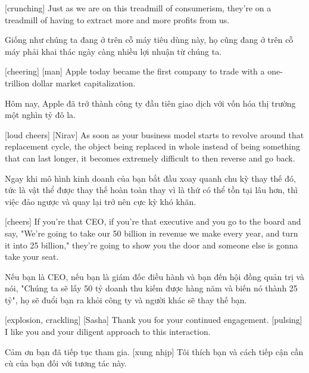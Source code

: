 \documentclass[a4paper]{article}
\begin{document}
	[crunching]
	Just as we are on this treadmill of consumerism, they're on a treadmill of having to extract more and more profits from us.
	
	\begin{vietnamese-v2}
		Giống như chúng ta đang ở trên cỗ máy tiêu dùng này, họ cũng đang ở trên cỗ máy phải khai thác ngày càng nhiều lợi nhuận từ chúng ta.
	\end{vietnamese-v2}
	
	[cheering]
	[man] Apple today became the first company to trade with a one-trillion dollar market capitalization.
	
	\begin{vietnamese-v2}
		 Hôm nay, Apple đã trở thành công ty đầu tiên giao dịch với vốn hóa thị trường một nghìn tỷ đô la.
	\end{vietnamese-v2}
	
	
	[loud cheers]
	[Nirav] As soon as your business model starts to revolve around that replacement cycle, the object being replaced in whole instead of being something that can last longer, it becomes extremely difficult to then reverse and go back.
	
	\begin{vietnamese-v2}
		 Ngay khi mô hình kinh doanh của bạn bắt đầu xoay quanh chu kỳ thay thế đó, tức là vật thể được thay thế hoàn toàn thay vì là thứ có thể tồn tại lâu hơn, thì việc đảo ngược và quay lại trở nên cực kỳ khó khăn.
	\end{vietnamese-v2}
	
	
	[cheers]
	If you're that CEO, if you're that executive and you go to the board and say, "We're going to take our 50 billion in revenue we make every year, and turn it into 25 billion," they're going to show you the door and someone else is gonna take your seat.
	
	
	\begin{vietnamese-v2}
		[hoan hô]
		Nếu bạn là CEO, nếu bạn là giám đốc điều hành và bạn đến hội đồng quản trị và nói, "Chúng ta sẽ lấy 50 tỷ doanh thu kiếm được hàng năm và biến nó thành 25 tỷ", họ sẽ đuổi bạn ra khỏi công ty và người khác sẽ thay thế bạn.
	\end{vietnamese-v2}
	
	[explosion, crackling]
	[Sasha] Thank you for your continued engagement.
	[pulsing]
	I like you and your diligent approach to this interaction.
	
	\begin{vietnamese-v2}
		 Cảm ơn bạn đã tiếp tục tham gia.
		[xung nhịp]
		Tôi thích bạn và cách tiếp cận cần cù của bạn đối với tương tác này.
	\end{vietnamese-v2}
	
\end{document}
